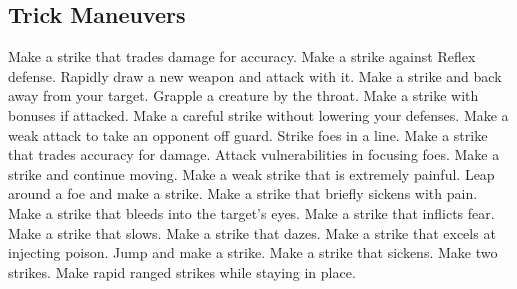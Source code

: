 \small
\subsection{Trick Maneuvers}\label{Trick Maneuvers}
\begin{spelllist}
 Make a strike that trades damage for accuracy.
 Make a strike against Reflex defense.
 Rapidly draw a new weapon and attack with it.
 Make a strike and back away from your target.
 Grapple a creature by the throat.
 Make a strike with bonuses if attacked.
 Make a careful strike without lowering your defenses.
 Make a weak attack to take an opponent off guard.
 Strike foes in a line.
 Make a strike that trades accuracy for damage.
 Attack vulnerabilities in focusing foes.
 Make a strike and continue moving.
 Make a weak strike that is extremely painful.
 Leap around a foe and make a strike.
 Make a strike that briefly sickens with pain.
 Make a strike that bleeds into the target's eyes.
 Make a strike that inflicts fear.
 Make a strike that slows.
 Make a strike that dazes.
 Make a strike that excels at injecting poison.
 Jump and make a strike.
 Make a strike that sickens.
 Make two strikes.
 Make rapid ranged strikes while staying in place.
\end{spelllist}



\small
